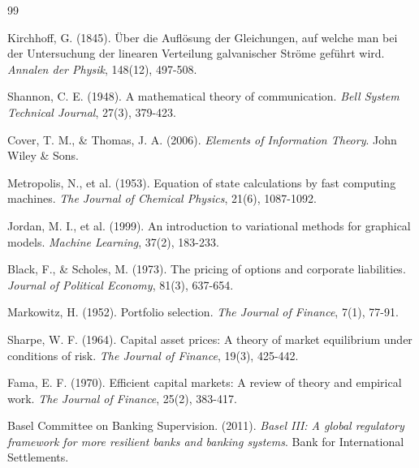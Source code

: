 \documentclass[12pt]{article}
\begin{document}

\begin{thebibliography}{99}

Kirchhoff, G. (1845). Über die Auflösung der Gleichungen, auf welche man bei der Untersuchung der linearen Verteilung galvanischer Ströme geführt wird. \textit{Annalen der Physik}, 148(12), 497-508.

Shannon, C. E. (1948). A mathematical theory of communication. \textit{Bell System Technical Journal}, 27(3), 379-423.

Cover, T. M., \& Thomas, J. A. (2006). \textit{Elements of Information Theory}. John Wiley \& Sons.

Metropolis, N., et al. (1953). Equation of state calculations by fast computing machines. \textit{The Journal of Chemical Physics}, 21(6), 1087-1092.

Jordan, M. I., et al. (1999). An introduction to variational methods for graphical models. \textit{Machine Learning}, 37(2), 183-233.

Black, F., \& Scholes, M. (1973). The pricing of options and corporate liabilities. \textit{Journal of Political Economy}, 81(3), 637-654.

Markowitz, H. (1952). Portfolio selection. \textit{The Journal of Finance}, 7(1), 77-91.

Sharpe, W. F. (1964). Capital asset prices: A theory of market equilibrium under conditions of risk. \textit{The Journal of Finance}, 19(3), 425-442.

Fama, E. F. (1970). Efficient capital markets: A review of theory and empirical work. \textit{The Journal of Finance}, 25(2), 383-417.

Basel Committee on Banking Supervision. (2011). \textit{Basel III: A global regulatory framework for more resilient banks and banking systems}. Bank for International Settlements.

\end{thebibliography}
\end{document}
